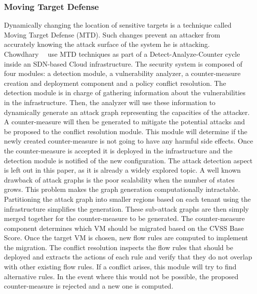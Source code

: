 \subsubsection{Moving Target Defense}
Dynamically changing the location of sensitive targets is a technique called Moving Target Defense (MTD). Such changes prevent an attacker from accurately knowing the attack surface of the system he is attacking. 
Chowdhary~\etal~\cite{Chowdhary2016} use MTD techniques as part of a Detect-Analyze-Counter cycle inside an SDN-based Cloud infrastructure. 
The security system is composed of four modules: a detection module, a vulnerability analyzer, a counter-measure creation and deployment component and a policy conflict resolution.
The detection module is in charge of gathering information about the vulnerabilities in the infrastructure.
Then, the analyzer will use these information to dynamically generate an attack graph representing the capacities of the attacker. 
A counter-measure will then be generated to mitigate the potential attacks and be proposed to the conflict resolution module. This module  will determine if the newly created counter-measure is not going to have any harmful side effects. Once the counter-measure is accepted it is deployed in the infrastructure and the detection module is notified of the new configuration. 
The attack detection aspect is left out in this paper, as it is already a widely explored topic.
A well known drawback of attack graphs is the poor scalability when the number of states grows.
This problem makes the graph generation computationally intractable. Partitioning the attack graph into smaller regions based on each tenant using the infrastructure simplifies the generation.
These sub-attack graphs are then simply merged together for the counter-measure to be generated.
The counter-measure component determines which VM should be migrated based on the CVSS Base Score.
Once the target VM is chosen, new flow rules are computed to implement the migration. 
The conflict resolution inspects the flow rules that should be deployed and extracts the actions of each rule and verify that they do not overlap with other existing flow rules. If a conflict arises, this module will try to find alternative rules. In the event where this would not be possible, the proposed counter-measure is rejected and a new one is computed.

